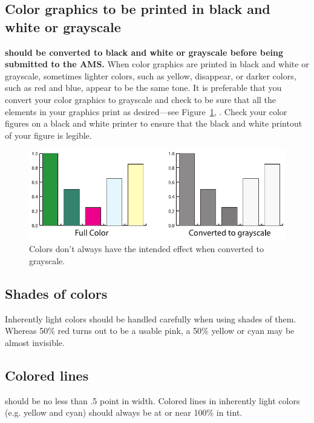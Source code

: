 \subsection{Color graphics to be printed in black and white or
 grayscale\texorpdfstring{\nopunct\ \ignorespaces}{}}
 \textbf{should be converted to black and white or grayscale before
 being submitted to the AMS\@.}
 When color graphics are printed in black and white or grayscale, sometimes
 lighter colors, such as yellow, disappear, or darker colors, such as red
 and blue, appear to be the same tone. It is preferable that you convert
 your color graphics to grayscale and check to be sure that all the
 elements in your graphics print as desired---see
 Figure~\ref{fig2gray}, . Check your color
 figures on a black and white printer to ensure that the black and white
 printout of your figure is legible.

\begin{figure}[t]
\includegraphics{Color2Gray}
\caption{Colors don't always have the intended effect when converted to grayscale.}
\label{fig2gray}
\end{figure}

\subsection{Shades of colors} Inherently light colors should be handled
 carefully when using shades of them. Whereas 50\% red turns out to be a
 usable pink, a 50\% yellow or cyan may be almost invisible.

\subsection{Colored lines\texorpdfstring{\nopunct}{}} should be no less
 than .5 point in width. Colored lines in inherently light colors
 (e.g. yellow and cyan) should always be at or near 100\% in tint.

